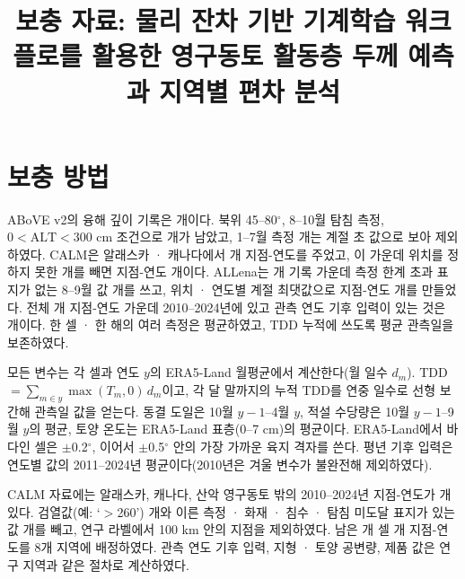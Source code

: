 \documentclass[pdflatex,sn-nature]{sn-jnl}
\begin{document}
\title{보충 자료: 물리 잔차 기반 기계학습 워크플로를 활용한 영구동토 활동층 두께 예측과 지역별 편차 분석}
\author[1]{}
\maketitle

\section{보충 방법}

ABoVE v2\cite{Moore2025}의 융해 깊이 기록은 \nqcAboveRaw{}개이다. 북위 45--80$^\circ$, 8--10월 탐침 측정, $0<\mathrm{ALT}<300$ cm 조건으로 \nqcAboveKept{}개가 남았고, 1--7월 측정 \nqcAboveEarly{}개는 계절 초 값으로 보아 제외하였다. CALM\cite{Streletskiy2025}은 알래스카 · 캐나다에서 \nqcCalmSy{}개 지점-연도를 주었고, 이 가운데 위치를 정하지 못한 \nqcCalmNoloc{}개를 빼면 지점-연도 \nqcCalmCy{}개이다. ALLena\cite{Veremeeva2025}는 \nqcLenaRaw{}개 기록 가운데 측정 한계 초과 표지가 없는 8--9월 값 \nqcLenaEos{}개를 쓰고, 위치 · 연도별 계절 최댓값으로 지점-연도 \nqcLenaCy{}개를 만들었다. 전체 \nqcTotalCy{}개 지점-연도 가운데 2010--2024년에 있고 관측 연도 기후 입력이 있는 것은 \nqcTotalCyIn{}개이다. 한 셀 · 한 해의 여러 측정은 평균하였고, TDD 누적에 쓰도록 평균 관측일을 보존하였다.

모든 변수는 각 셀과 연도 $y$의 ERA5-Land 월평균에서 계산한다(월 일수 $d_m$). TDD $=\sum_{m\in y}\max(T_m,0)\,d_m$이고, 각 달 말까지의 누적 TDD를 연중 일수로 선형 보간해 관측일 값을 얻는다. 동결 도일은 10월 $y-1$--4월 $y$, 적설 수당량은 10월 $y-1$--9월 $y$의 평균, 토양 온도는 ERA5-Land 표층(0--7 cm)의 평균이다. ERA5-Land에서 바다인 셀은 $\pm$0.2$^\circ$, 이어서 $\pm$0.5$^\circ$ 안의 가장 가까운 육지 격자를 쓴다. 평년 기후 입력은 연도별 값의 2011--2024년 평균이다(2010년은 겨울 변수가 불완전해 제외하였다).

CALM 자료\cite{Streletskiy2025}에는 알래스카, 캐나다, 산악 영구동토 밖의 2010--2024년 지점-연도가 \nextRawSy{}개 있다. 검열값(예: `$>$260') \nextCens{}개와 이른 측정 · 화재 · 침수 · 탐침 미도달 표지가 있는 값 \nextQcRm{}개를 빼고, 연구 라벨에서 100 km 안의 지점을 제외하였다. 남은 \nextcells{}개 셀 \nextcy{}개 지점-연도를 8개 지역에 배정하였다. 관측 연도 기후 입력, 지형 · 토양 공변량, 제품 값은 연구 지역과 같은 절차로 계산하였다.
\end{document}

